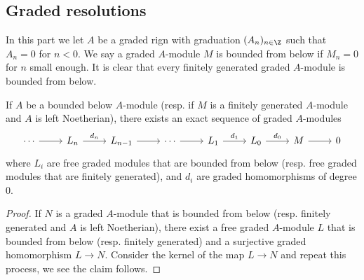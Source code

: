 \subsection{Graded resolutions}
In this part we let $A$ be a graded rign with graduation $(A_n)_{n\in\Z}$ such that $A_n=0$ for $n<0$. We say a graded $A$-module $M$ is bounded from below if $M_n=0$ for $n$ small enough. It is clear that every finitely generated graded $A$-module is bounded from below.
\begin{proposition}\label{module graded resolution exist}
If $A$ be a bounded below $A$-module (resp. if $M$ is a finitely generated $A$-module and $A$ is left Noetherian), there exists an exact sequence of graded $A$-modules
\[\begin{tikzcd}
\cdots\ar[r]&L_n\ar[r,"d_n"]&L_{n-1}\ar[r]&\cdots\ar[r]&L_1\ar[r,"d_1"]&L_0\ar[r,"d_0"]&M\ar[r]&0
\end{tikzcd}\]
where $L_i$ are free graded modules that are bounded from below (resp. free graded modules that are finitely generated), and $d_i$ are graded homomorphisms of degree $0$.
\end{proposition}
\begin{proof}
If $N$ is a graded $A$-module that is bounded from below (resp. finitely generated and $A$ is left Noetherian), there exist a free graded $A$-module $L$ that is bounded from below (resp. finitely generated) and a surjective graded homomorphism $L\to N$. Consider the kernel of the map $L\to N$ and repeat this process, we see the claim follows.
\end{proof}
